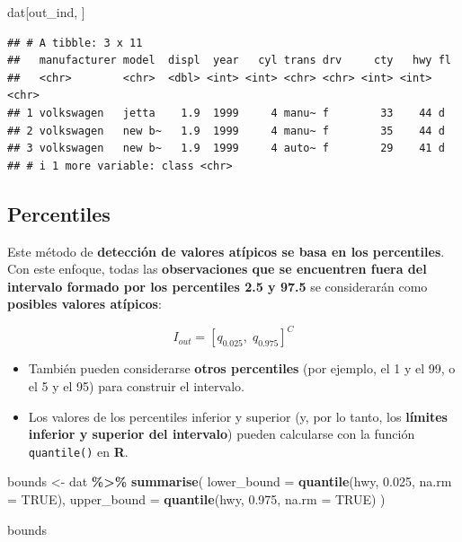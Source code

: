 \documentclass[
]{book}
\newenvironment{Shaded}{\begin{snugshade}}{\end{snugshade}}
\newcommand{\AttributeTok}[1]{\textcolor[rgb]{0.13,0.29,0.53}{#1}}
\newcommand{\ConstantTok}[1]{\textcolor[rgb]{0.56,0.35,0.01}{#1}}
\newcommand{\FloatTok}[1]{\textcolor[rgb]{0.00,0.00,0.81}{#1}}
\newcommand{\FunctionTok}[1]{\textcolor[rgb]{0.13,0.29,0.53}{\textbf{#1}}}
\newcommand{\NormalTok}[1]{#1}
\newcommand{\OtherTok}[1]{\textcolor[rgb]{0.56,0.35,0.01}{#1}}
\newcommand{\SpecialCharTok}[1]{\textcolor[rgb]{0.81,0.36,0.00}{\textbf{#1}}}
\begin{document}
\begin{Shaded}
\begin{Highlighting}[]
\NormalTok{dat[out\_ind, ]}
\end{Highlighting}
\end{Shaded}

\begin{verbatim}
## # A tibble: 3 x 11
##   manufacturer model  displ  year   cyl trans drv     cty   hwy fl   
##   <chr>        <chr>  <dbl> <int> <int> <chr> <chr> <int> <int> <chr>
## 1 volkswagen   jetta    1.9  1999     4 manu~ f        33    44 d    
## 2 volkswagen   new b~   1.9  1999     4 manu~ f        35    44 d    
## 3 volkswagen   new b~   1.9  1999     4 auto~ f        29    41 d    
## # i 1 more variable: class <chr>
\end{verbatim}

\subsection{Percentiles}\label{percentiles}

Este método de \textbf{detección de valores atípicos se basa en los percentiles}. Con este enfoque, todas las \textbf{observaciones que se encuentren fuera del intervalo formado por los percentiles 2.5 y 97.5} se considerarán como \textbf{posibles valores atípicos}:

\[
I_{out} = \left[ q_{0.025}, \; q_{0.975} \right]^C
\]

\begin{itemize}
\item
  También pueden considerarse \textbf{otros percentiles} (por ejemplo, el 1 y el 99, o el 5 y el 95) para construir el intervalo.
\item
  Los valores de los percentiles inferior y superior (y, por lo tanto, los \textbf{límites inferior y superior del intervalo}) pueden calcularse con la función \texttt{quantile()} en \textbf{R}.
\end{itemize}

\begin{Shaded}
\begin{Highlighting}[]
\NormalTok{bounds }\OtherTok{\textless{}{-}}\NormalTok{ dat }\SpecialCharTok{\%\textgreater{}\%}
  \FunctionTok{summarise}\NormalTok{(}
    \AttributeTok{lower\_bound =} \FunctionTok{quantile}\NormalTok{(hwy, }\FloatTok{0.025}\NormalTok{, }\AttributeTok{na.rm =} \ConstantTok{TRUE}\NormalTok{),}
    \AttributeTok{upper\_bound =} \FunctionTok{quantile}\NormalTok{(hwy, }\FloatTok{0.975}\NormalTok{, }\AttributeTok{na.rm =} \ConstantTok{TRUE}\NormalTok{)}
\NormalTok{  )}

\NormalTok{bounds}
\end{Highlighting}
\end{Shaded}
\end{document}
